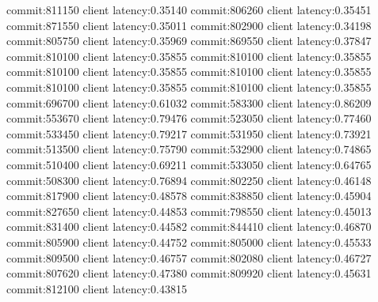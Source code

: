 commit:811150 client latency:0.35140
commit:806260 client latency:0.35451
commit:871550 client latency:0.35011
commit:802900 client latency:0.34198
commit:805750 client latency:0.35969
commit:869550 client latency:0.37847
commit:810100 client latency:0.35855
commit:810100 client latency:0.35855
commit:810100 client latency:0.35855
commit:810100 client latency:0.35855
commit:810100 client latency:0.35855
commit:810100 client latency:0.35855
commit:696700 client latency:0.61032
commit:583300 client latency:0.86209
commit:553670 client latency:0.79476
commit:523050 client latency:0.77460
commit:533450 client latency:0.79217
commit:531950 client latency:0.73921
commit:513500 client latency:0.75790
commit:532900 client latency:0.74865
commit:510400 client latency:0.69211
commit:533050 client latency:0.64765
commit:508300 client latency:0.76894
commit:802250 client latency:0.46148
commit:817900 client latency:0.48578
commit:838850 client latency:0.45904
commit:827650 client latency:0.44853
commit:798550 client latency:0.45013
commit:831400 client latency:0.44582
commit:844410 client latency:0.46870
commit:805900 client latency:0.44752
commit:805000 client latency:0.45533
commit:809500 client latency:0.46757
commit:802080 client latency:0.46727
commit:807620 client latency:0.47380
commit:809920 client latency:0.45631
commit:812100 client latency:0.43815